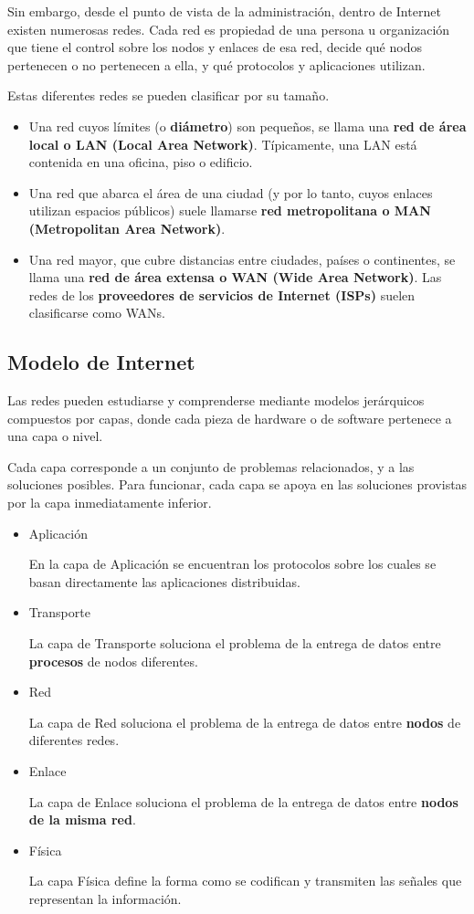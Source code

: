 \documentclass[spanish,a4paper,]{article}
\providecommand{\tightlist}{%
  \setlength{\itemsep}{0pt}\setlength{\parskip}{0pt}}
\begin{document}
Sin embargo, desde el punto de vista de la administración, dentro de
Internet existen numerosas redes. Cada red es propiedad de una persona u
organización que tiene el control sobre los nodos y enlaces de esa red,
decide qué nodos pertenecen o no pertenecen a ella, y qué protocolos y
aplicaciones utilizan.

Estas diferentes redes se pueden clasificar por su tamaño.

\begin{itemize}
\tightlist
\item
  Una red cuyos límites (o \textbf{diámetro}) son pequeños, se llama una
  \textbf{red de área local o LAN (Local Area Network)}. Típicamente,
  una LAN está contenida en una oficina, piso o edificio.
\item
  Una red que abarca el área de una ciudad (y por lo tanto, cuyos
  enlaces utilizan espacios públicos) suele llamarse \textbf{red
  metropolitana o MAN (Metropolitan Area Network)}.
\item
  Una red mayor, que cubre distancias entre ciudades, países o
  continentes, se llama una \textbf{red de área extensa o WAN (Wide Area
  Network)}. Las redes de los \textbf{proveedores de servicios de
  Internet (ISPs)} suelen clasificarse como WANs.
\end{itemize}

\hypertarget{modelo-de-internet}{%
\subsection{Modelo de Internet}\label{modelo-de-internet}}

Las redes pueden estudiarse y comprenderse mediante modelos jerárquicos
compuestos por capas, donde cada pieza de hardware o de software
pertenece a una capa o nivel.

Cada capa corresponde a un conjunto de problemas relacionados, y a las
soluciones posibles. Para funcionar, cada capa se apoya en las
soluciones provistas por la capa inmediatamente inferior.

\begin{itemize}
\item
  Aplicación

  En la capa de Aplicación se encuentran los protocolos sobre los cuales
  se basan directamente las aplicaciones distribuidas.
\item
  Transporte

  La capa de Transporte soluciona el problema de la entrega de datos
  entre \textbf{procesos} de nodos diferentes.
\item
  Red

  La capa de Red soluciona el problema de la entrega de datos entre
  \textbf{nodos} de diferentes redes.
\item
  Enlace

  La capa de Enlace soluciona el problema de la entrega de datos entre
  \textbf{nodos de la misma red}.
\item
  Física

  La capa Física define la forma como se codifican y transmiten las
  señales que representan la información.
\end{itemize}
\end{document}
